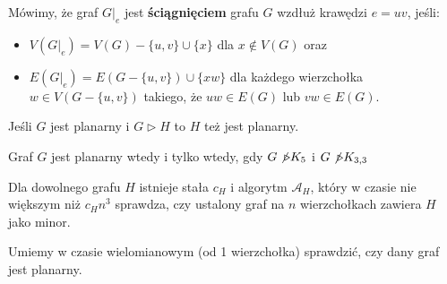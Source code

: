 \begin{definition}
Mówimy, że graf $G|_e$ jest \textbf{ściągnięciem} grafu $G$ wzdłuż krawędzi $e = uv$, jeśli:
\begin{itemize}
\item[] $V (G|_e) = V (G) - \{u, v\} \cup \{x\}$ dla $x \not \in V (G)$ oraz
\item[] $E (G|_e) = E (G - \{u, v\})\cup \{xw\}$ dla każdego wierzchołka $w \in V (G-\{u, v\})$ takiego, że $uw \in E(G)$ lub $vw \in E(G)$.
\end{itemize}
\end{definition}

\begin{fact*}
Jeśli $G$ jest planarny i $G\triangleright H$ to $H$ też jest planarny.
\end{fact*}

\begin{theorem}[Wagner]\label{the:Wagner} Graf $G$ jest planarny wtedy i tylko wtedy, gdy $G\not \triangleright K_5$ i $G\not \triangleright K_{3,3}$
\end{theorem}

\begin{theorem}\label{the:RobertsonSeymour} Dla dowolnego grafu $H$ istnieje stała $c_H$ i algorytm $\mathcal{A}_H$, który w czasie nie większym niż $c_H n^3$ sprawdza, czy ustalony graf na $n$ wierzchołkach zawiera $H$ jako minor.
\end{theorem}
\begin{remark}
Umiemy w czasie wielomianowym (od 1 wierzchołka) sprawdzić, czy dany graf jest planarny.
\end{remark}

